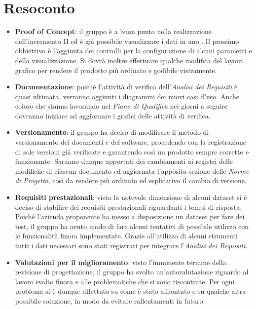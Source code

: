 \section{Resoconto}
\begin{itemize}
\item \textbf{Proof of Concept}: il gruppo è a buon punto nella realizzazione dell'incremento II ed è già possibile visualizzare i dati in uno . Il prossimo obbiettivo è l'aggiunta dei controlli per la configurazione di alcuni parametri e della visualizzazione. Si dovrà inoltre effettuare qualche modifica del layout grafico per rendere il prodotto più ordinato e godibile visivamente. 

\item\textbf{Documentazione}: poiché l'attività di verifica dell'\textit{Analisi dei Requisiti} è quasi ultimata, verranno aggiunti i diagrammi dei nuovi casi d'uso. Anche coloro che stanno lavorando nel \textit{Piano di Qualifica} nei giorni a seguire dovranno iniziare ad aggiornare i grafici delle attività di verifica.

\item\textbf{Versionamento}: il gruppo ha deciso di modificare il metodo di versionamento dei documenti e del software, procedendo con la registrazione di sole versioni già verificate e garantendo così un prodotto sempre corretto e funzionante. Saranno dunque apportati dei cambiamenti ai registri delle modifiche di ciascun documento ed aggiornata l'apposita sezione delle \textit{Norme di Progetto}, così da rendere più ordinato ed esplicativo il cambio di versione.

\item \textbf{Requisiti prestazionali}: vista la notevole dimensione di alcuni dataset si è deciso di stabilire dei requisiti prestazionali riguardanti i tempi di risposta. Poiché l'azienda proponente ha messo a disposizione un dataset per fare dei test, il gruppo ha avuto modo di fare alcuni tentativi di possibile utilizzo con le funzionalità finora implementate. Grazie all'utilizzo di alcuni strumenti tutti i dati necessari sono stati registrati per integrare l'\textit{Analisi dei Requisiti}.

\item\textbf{Valutazioni per il miglioramento}: visto l'imminente termine della revisione di progettazione, il gruppo ha svolto un'autovalutazione riguardo al lavoro svolto finora e alle problematiche che si sono riscontrate. Per ogni problema si è dunque riflettuto su come è stato affrontato e su qualche altra possibile soluzione, in modo da evitare rallentamenti in futuro.


\end{itemize}
